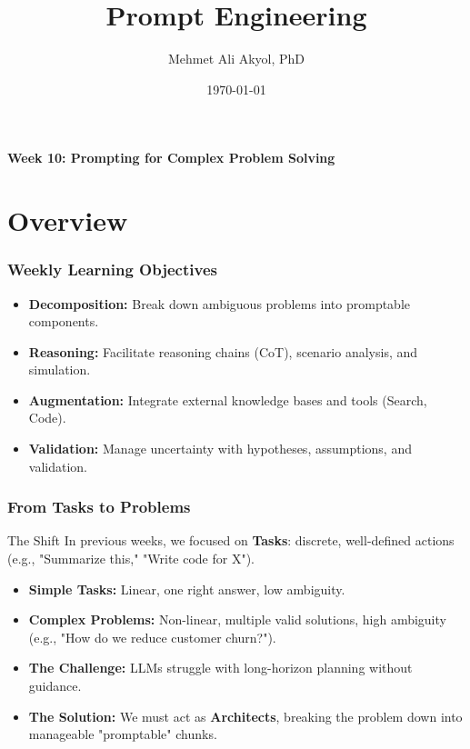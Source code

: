 \documentclass{beamer}
\title{Prompt Engineering}
\author{Mehmet Ali Akyol, PhD}
\institute{Ankara Medipol University}
\date{\today}
\begin{document}
\begin{frame}
    \titlepage
    \begin{center}
        \vspace{1cm}
        \textbf{Week 10: Prompting for Complex Problem Solving}
    \end{center}
\end{frame}

\section{Overview}

\begin{frame}
    \frametitle{Weekly Learning Objectives}
    \begin{itemize}
        \item \textbf{Decomposition:} Break down ambiguous problems into promptable components.
        \item \textbf{Reasoning:} Facilitate reasoning chains (CoT), scenario analysis, and simulation.
        \item \textbf{Augmentation:} Integrate external knowledge bases and tools (Search, Code).
        \item \textbf{Validation:} Manage uncertainty with hypotheses, assumptions, and validation.
    \end{itemize}
\end{frame}

\begin{frame}
    \frametitle{From Tasks to Problems}
    \begin{block}{The Shift}
        In previous weeks, we focused on \textbf{Tasks}: discrete, well-defined actions (e.g., "Summarize this," "Write code for X").
    \end{block}
    \begin{itemize}
        \item \textbf{Simple Tasks:} Linear, one right answer, low ambiguity.
        \item \textbf{Complex Problems:} Non-linear, multiple valid solutions, high ambiguity (e.g., "How do we reduce customer churn?").
        \item \textbf{The Challenge:} LLMs struggle with long-horizon planning without guidance.
        \item \textbf{The Solution:} We must act as \textbf{Architects}, breaking the problem down into manageable "promptable" chunks.
    \end{itemize}
\end{frame}
\end{document}
